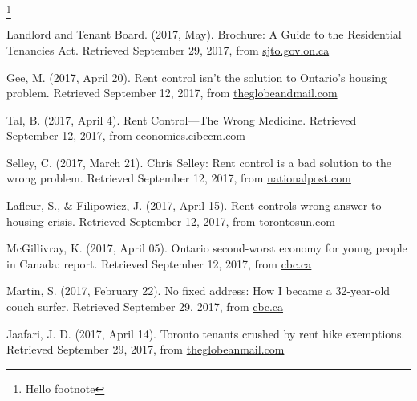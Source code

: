 \footnote{\label{myfootnote}Hello footnote}


\begin{thebibliography}{9}

 Landlord and Tenant Board. (2017, May). Brochure: A Guide to the Residential Tenancies Act. Retrieved September 29, 2017, from \href{http://www.sjto.gov.on.ca/documents/ltb/Brochures/Guide\%20to\%20RTA\%20(English).html}{sjto.gov.on.ca}

 Gee, M. (2017, April 20). Rent control isn't the solution to Ontario's housing problem. Retrieved September 12, 2017, from \href{https://beta.theglobeandmail.com/news/toronto/rent-control-isnt-the-solution-to-ontarios-housing-problem/article34753102/}{theglobeandmail.com}

 Tal, B. (2017, April 4). Rent Control—The Wrong Medicine. Retrieved September 12, 2017, from \href{https://economics.cibccm.com/economicsweb/cds?ID=2595&TYPE=EC_PDF}{economics.cibccm.com}

 Selley, C. (2017, March 21). Chris Selley: Rent control is a bad solution to the wrong problem. Retrieved September 12, 2017, from \href{http://nationalpost.com/news/toronto/chris-selley-rent-control-is-a-bad-solution-to-the-wrong-problem}{nationalpost.com}

 Lafleur, S., \& Filipowicz, J. (2017, April 15). Rent controls wrong answer to housing crisis. Retrieved September 12, 2017, from \href{http://www.torontosun.com/2017/04/15/rent-controls-wrong-answer-to-housing-crisis}{torontosun.com}

  McGillivray, K. (2017, April 05). Ontario second-worst economy for young people in Canada: report. Retrieved September 12, 2017, from \href{http://www.cbc.ca/news/canada/toronto/generation-squeeze-ontario-economy-1.4054589}{cbc.ca}
  
  Martin, S. (2017, February 22). No fixed address: How I became a 32-year-old couch surfer. Retrieved September 29, 2017, from \href{http://www.cbc.ca/news/canada/toronto/no-fixed-address-how-i-became-a-32-year-old-couch-surfer-1.3985771}{cbc.ca}

  Jaafari, J. D. (2017, April 14). Toronto tenants crushed by rent hike exemptions. Retrieved September 29, 2017, from \href{https://beta.theglobeandmail.com/news/toronto/toronto-tenants-crushed-by-rent-hike-exemptions/article33806825/}{theglobeanmail.com}


\end{thebibliography}
